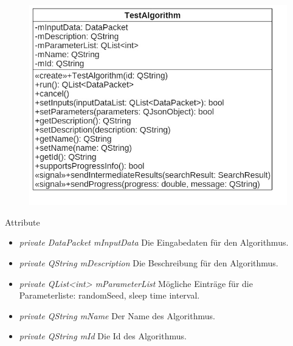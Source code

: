 \begin{figure}[H]
\centering
\includegraphics[scale=0.5]{img/Klassendiagramm/Klassen/TestAlgorithm}
\label{fig:testAlgorithm}
\end{figure}

Attribute
\begin{itemize}
\item\textit{private DataPacket mInputData} Die Eingabedaten für den Algorithmus.
\item\textit{private QString mDescription} Die Beschreibung für den Algorithmus.
\item\textit{private QList<int> mParameterList} Mögliche Einträge für die Parameterliste: randomSeed, sleep time interval.
\item\textit{private QString mName} Der Name des Algorithmus.
\item\textit{private QString mId} Die Id des Algorithmus.
\end{itemize}

